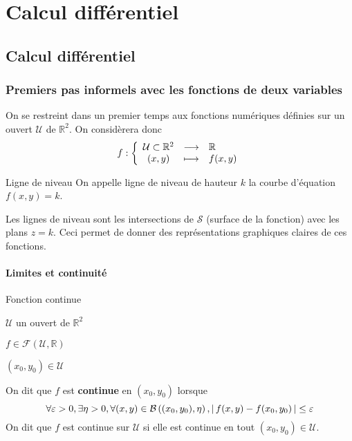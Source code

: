 \chapter{Calcul différentiel}
\chaptertoc

\section{Calcul différentiel}

\subsection{Premiers pas informels avec les fonctions de deux variables}

    On se restreint dans un premier temps aux fonctions numériques définies sur un ouvert $\mathcal{U}$ de $\mathbb{R}^2$. On considèrera donc 
    \[ \fonction{f}{\mathcal{U} \subset \mathbb{R}^2}{\mathbb{R}}{(x,y)}{f(x,y)} \]   

    \begin{defi}{Ligne de niveau}{}
        On appelle ligne de niveau de hauteur $k$ la courbe d’équation $f(x,y) = k$. 
    \end{defi}

    Les lignes de niveau sont les intersections de $\mathcal{S}$ (surface de la fonction) avec les plans $z = k$. Ceci permet de donner des représentations graphiques claires de ces fonctions.

    \subsubsection{Limites et continuité}

    \begin{defi}{Fonction continue}{}
        \begin{soient}
            \item $\mathcal{U}$ un ouvert de $\mathbb{R}^2$
            \item $f \in \mathcal{F}(\mathcal{U},\mathbb{R})$
            \item $(x_0,y_0) \in \mathcal{U}$
        \end{soient}
        On dit que $f$ est \textbf{continue} en $(x_0,y_0)$ lorsque 
        \[ \forall \varepsilon > 0,  \exists \eta > 0,  \forall(x,y) \in \mathcal{B}\left((x_0,y_0),\eta\right),  \left\lvert \,f(x,y)-f(x_0,y_0) \, \right\rvert \leq \varepsilon \]
        On dit que $f$ est continue sur $\mathcal{U}$ si elle est continue en tout $(x_0,y_0) \in \mathcal{U}$.
    \end{defi}

